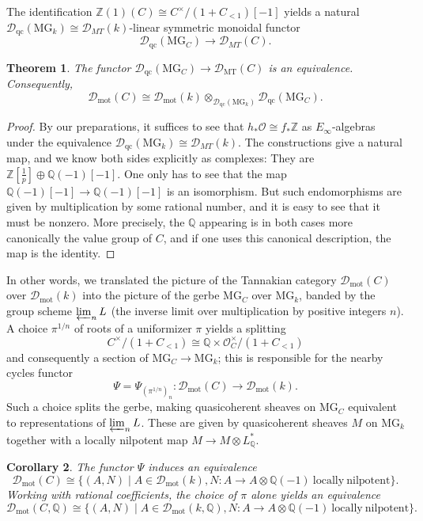 \documentclass[11pt]{amsart}
\numberwithin{equation}{section}
\newtheorem{theorem}{Theorem}
\numberwithin{theorem}{section}
\newtheorem{corollary}[theorem]{Corollary}
\theoremstyle{definition}
\begin{document}
The identification $\mathbb Z(1)(C)\cong C^\times/(1+C_{<1})[-1]$ yields a natural $\mathcal D_{\mathrm{qc}}(\mathrm{MG}_k)\cong \mathcal D_{MT}(k)$-linear symmetric monoidal functor
\[
\mathcal D_{\mathrm{qc}}(\mathrm{MG}_C)\to \mathcal D_{MT}(C).
\]

\begin{theorem} The functor $\mathcal D_{\mathrm{qc}}(\mathrm{MG}_C)\to \mathcal D_{\mathrm{MT}}(C)$ is an equivalence. Consequently,
\[
\mathcal D_{\mathrm{mot}}(C)\cong \mathcal D_{\mathrm{mot}}(k)\otimes_{\mathcal D_{\mathrm{qc}}(\mathrm{MG}_k)} \mathcal D_{\mathrm{qc}}(\mathrm{MG}_C).
\]
\end{theorem}

\begin{proof} By our preparations, it suffices to see that $h_\ast \mathcal O\cong f_\ast \mathbb Z$ as $E_\infty$-algebras under the equivalence $\mathcal D_{\mathrm{qc}}(\mathrm{MG}_k)\cong \mathcal D_{MT}(k)$. The constructions give a natural map, and we know both sides explicitly as complexes: They are $\mathbb Z[\tfrac 1p]\oplus \mathbb Q(-1)[-1]$. One only has to see that the map $\mathbb Q(-1)[-1]\to \mathbb Q(-1)[-1]$ is an isomorphism. But such endomorphisms are given by multiplication by some rational number, and it is easy to see that it must be nonzero. More precisely, the $\mathbb Q$ appearing is in both cases more canonically the value group of $C$, and if one uses this canonical description, the map is the identity.
\end{proof}

In other words, we translated the picture of the Tannakian category $\mathcal D_{\mathrm{mot}}(C)$ over $\mathcal D_{\mathrm{mot}}(k)$ into the picture of the gerbe $\mathrm{MG}_C$ over $\mathrm{MG}_k$, banded by the group scheme $\varprojlim_{n} L$ (the inverse limit over multiplication by positive integers $n$). A choice $\pi^{1/n}$ of roots of a uniformizer $\pi$ yields a splitting
\[
C^\times/(1+C_{<1})\cong \mathbb Q\times \mathcal O_C^\times/(1+C_{<1})
\]
and consequently a section of $\mathrm{MG}_C\to \mathrm{MG}_k$; this is responsible for the nearby cycles functor
\[
\Psi = \Psi_{(\pi^{1/n})_n}: \mathcal D_{\mathrm{mot}}(C)\to \mathcal D_{\mathrm{mot}}(k).
\]
Such a choice splits the gerbe, making quasicoherent sheaves on $\mathrm{MG}_C$ equivalent to representations of $\varprojlim_{n} L$. These are given by quasicoherent sheaves $M$ on $\mathrm{MG}_k$ together with a locally nilpotent map $M\to M\otimes L^\ast_{\mathbb Q}$.

\begin{corollary} The functor $\Psi$ induces an equivalence
\[
\mathcal D_{\mathrm{mot}}(C)\cong \{(A,N)\mid A\in \mathcal D_{\mathrm{mot}}(k), N: A\to A\otimes \mathbb Q(-1)\ \mathrm{locally}\ \mathrm{nilpotent}\}.
\]
Working with rational coefficients, the choice of $\pi$ alone yields an equivalence
\[
\mathcal D_{\mathrm{mot}}(C,\mathbb Q)\cong \{(A,N)\mid A\in \mathcal D_{\mathrm{mot}}(k,\mathbb Q), N: A\to A\otimes \mathbb Q(-1)\ \mathrm{locally}\ \mathrm{nilpotent}\}.
\]
\end{corollary}
\end{document}

